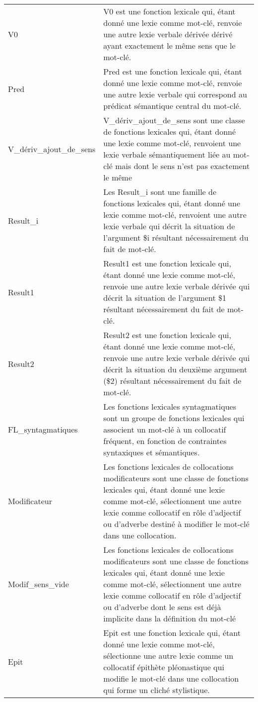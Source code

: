 \begin{longtable}{ll}
V0 & V0 est une fonction lexicale qui, étant donné une lexie comme mot-clé, renvoie une autre lexie verbale dérivée dérivé ayant exactement le même sens que le mot-clé. \\
Pred & Pred est une fonction lexicale qui, étant donné une lexie comme mot-clé, renvoie une autre lexie verbale qui correspond au prédicat sémantique central du mot-clé. \\
V\_dériv\_ajout\_de\_sens & V\_dériv\_ajout\_de\_sens sont une classe de fonctions lexicales qui, étant donné une lexie comme mot-clé, renvoient une lexie verbale sémantiquement liée au mot-clé mais dont le sens n'est pas exactement le même \\
Result\_i & Les Result\_i sont une famille de fonctions lexicales qui, étant donné une lexie comme mot-clé, renvoient une autre lexie verbale qui décrit la situation de l'argument \$i résultant nécessairement du fait de mot-clé.  \\
Result1 & Result1 est une fonction lexicale qui, étant donné une lexie comme mot-clé, renvoie une autre lexie verbale dérivée qui décrit la situation de l'argument \$1 résultant nécessairement du fait de mot-clé. \\
Result2 & Result2 est une fonction lexicale qui, étant donné une lexie comme mot-clé, renvoie une autre lexie verbale dérivée qui décrit la situation du deuxième argument (\$2) résultant nécessairement du fait de mot-clé. \\
FL\_syntagmatiques & Les fonctions lexicales syntagmatiques sont un groupe de fonctions lexicales qui associent un mot-clé à un collocatif fréquent, en fonction de contraintes syntaxiques et sémantiques. \\
Modificateur & Les fonctions lexicales de collocations modificateurs sont une classe de fonctions lexicales qui, étant donné une lexie comme mot-clé, sélectionnent une autre lexie comme collocatif en rôle d'adjectif ou d'adverbe destiné à modifier le mot-clé dans une collocation. \\
Modif\_sens\_vide & Les fonctions lexicales de collocations modificateurs sont une classe de fonctions lexicales qui, étant donné une lexie comme mot-clé, sélectionnent une autre lexie comme collocatif en rôle d'adjectif ou d'adverbe dont le sens est déjà implicite dans la définition du mot-clé \\
Epit & Epit est une fonction lexicale qui, étant donné une lexie comme mot-clé, sélectionne une autre lexie comme un collocatif épithète pléonastique qui modifie le mot-clé dans une collocation qui forme un cliché stylistique. \\

\end{longtable}
